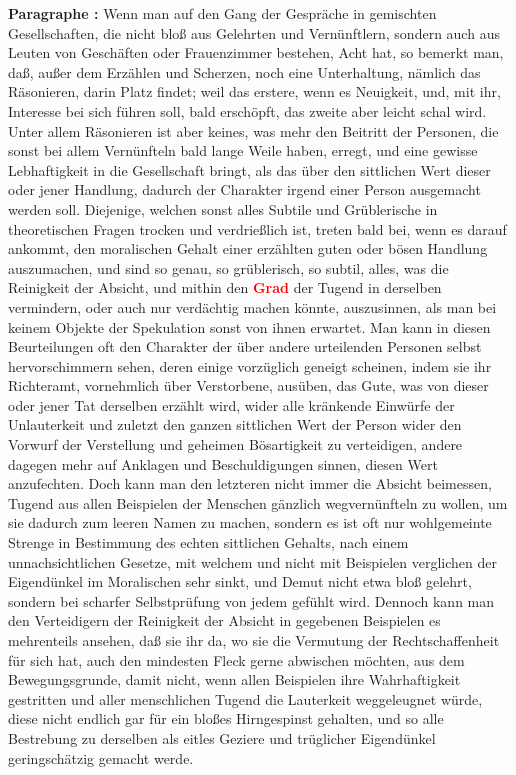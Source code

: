 \documentclass[a4paper,12pt,twoside]{book}
\newcommand{\match}[1]{\textcolor{red}{\textbf{#1}}}
\begin{document}
	\noindent\textbf{Paragraphe : }Wenn man auf den Gang der Gespräche in gemischten Gesellschaften, die nicht bloß aus Gelehrten und Vernünftlern, sondern auch aus Leuten von Geschäften oder Frauenzimmer bestehen, Acht hat, so bemerkt man, daß, außer dem Erzählen und Scherzen, noch eine Unterhaltung, nämlich das Räsonieren, darin Platz findet; weil das erstere, wenn es Neuigkeit, und, mit ihr, Interesse bei sich führen soll, bald erschöpft, das zweite aber leicht schal wird. Unter allem Räsonieren ist aber keines, was mehr den Beitritt der Personen, die sonst bei allem Vernünfteln bald lange Weile haben, erregt, und eine gewisse Lebhaftigkeit in die Gesellschaft bringt, als das über den sittlichen Wert dieser oder jener Handlung, dadurch der Charakter irgend einer Person ausgemacht werden soll. Diejenige, welchen sonst alles Subtile und Grüblerische in theoretischen Fragen trocken und verdrießlich ist, treten bald bei, wenn es darauf ankommt, den moralischen Gehalt einer erzählten guten oder bösen Handlung auszumachen, und sind so genau, so grüblerisch, so subtil, alles, was die Reinigkeit der Absicht, und mithin  den \match{Grad} der Tugend in derselben vermindern, oder auch nur verdächtig machen könnte, auszusinnen, als man bei keinem Objekte der Spekulation sonst von ihnen erwartet. Man kann in diesen Beurteilungen oft den Charakter der über andere urteilenden Personen selbst hervorschimmern sehen, deren einige vorzüglich geneigt scheinen, indem sie ihr Richteramt, vornehmlich über Verstorbene, ausüben, das Gute, was von dieser oder jener Tat derselben erzählt wird, wider alle kränkende Einwürfe der Unlauterkeit und zuletzt den ganzen sittlichen Wert der Person wider den Vorwurf der Verstellung und geheimen Bösartigkeit zu verteidigen, andere dagegen mehr auf Anklagen und Beschuldigungen sinnen, diesen Wert anzufechten. Doch kann man den letzteren nicht immer die Absicht beimessen, Tugend aus allen Beispielen der Menschen gänzlich wegvernünfteln zu wollen, um sie dadurch zum leeren Namen zu machen, sondern es ist oft nur wohlgemeinte Strenge in Bestimmung des echten sittlichen Gehalts, nach einem unnachsichtlichen Gesetze, mit welchem und nicht mit Beispielen verglichen der Eigendünkel im Moralischen sehr sinkt, und Demut nicht etwa bloß gelehrt, sondern bei scharfer Selbstprüfung von jedem gefühlt wird. Dennoch kann man den Verteidigern der Reinigkeit der Absicht in gegebenen Beispielen es mehrenteils ansehen, daß sie ihr da, wo sie die Vermutung der Rechtschaffenheit für sich hat, auch den mindesten Fleck gerne abwischen möchten, aus dem Bewegungsgrunde, damit nicht, wenn allen Beispielen ihre Wahrhaftigkeit gestritten und aller menschlichen Tugend die Lauterkeit weggeleugnet würde, diese nicht endlich gar für ein bloßes Hirngespinst gehalten, und so alle Bestrebung zu derselben als eitles Geziere und trüglicher Eigendünkel geringschätzig gemacht werde. 
	
\end{document}
